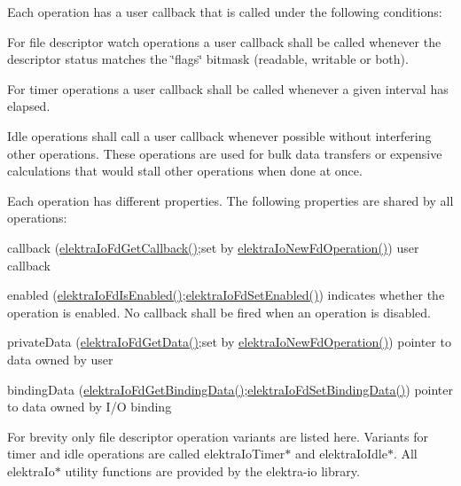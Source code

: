 Each operation has a user callback that is called under the following conditions\+:
\begin{DoxyItemize}
\item For file descriptor watch operations a user callback shall be called whenever the descriptor status matches the \char`\"{}flags\char`\"{} bitmask (readable, writable or both).
\item For timer operations a user callback shall be called whenever a given interval has elapsed.
\item Idle operations shall call a user callback whenever possible without interfering other operations. These operations are used for bulk data transfers or expensive calculations that would stall other operations when done at once.
\end{DoxyItemize}

Each operation has different properties. The following properties are shared by all operations\+:
\begin{DoxyItemize}
\item callback (\hyperlink{io_8c_a885381fdd55cf957af1d65db7522899a}{elektra\+Io\+Fd\+Get\+Callback()};set by \hyperlink{io_8c_a3804183da1aecdfcf09455d246c3891c}{elektra\+Io\+New\+Fd\+Operation()}) user callback
\item enabled (\hyperlink{io_8c_af35cfd8a33db0170e06cb8c3cdc08244}{elektra\+Io\+Fd\+Is\+Enabled()};\hyperlink{io_8c_a56f8b0059e6c7708681624d1994e4b44}{elektra\+Io\+Fd\+Set\+Enabled()}) indicates whether the operation is enabled. No callback shall be fired when an operation is disabled.
\item private\+Data (\hyperlink{io_8c_a6a2a281c9e437dd1d660f1310fa06108}{elektra\+Io\+Fd\+Get\+Data()};set by \hyperlink{io_8c_a3804183da1aecdfcf09455d246c3891c}{elektra\+Io\+New\+Fd\+Operation()}) pointer to data owned by user
\item binding\+Data (\hyperlink{io_8c_a6103b457ed1440d0490acf0a6ec17386}{elektra\+Io\+Fd\+Get\+Binding\+Data()};\hyperlink{io_8c_ae02ec122aafa67b7dd92d9c3daa6499e}{elektra\+Io\+Fd\+Set\+Binding\+Data()}) pointer to data owned by I/O binding
\end{DoxyItemize}

For brevity only file descriptor operation variants are listed here. Variants for timer and idle operations are called {\ttfamily elektra\+Io\+Timer$\ast$} and {\ttfamily elektra\+Io\+Idle$\ast$}. All {\ttfamily elektra\+Io$\ast$} utility functions are provided by the {\ttfamily elektra-\/io} library.

